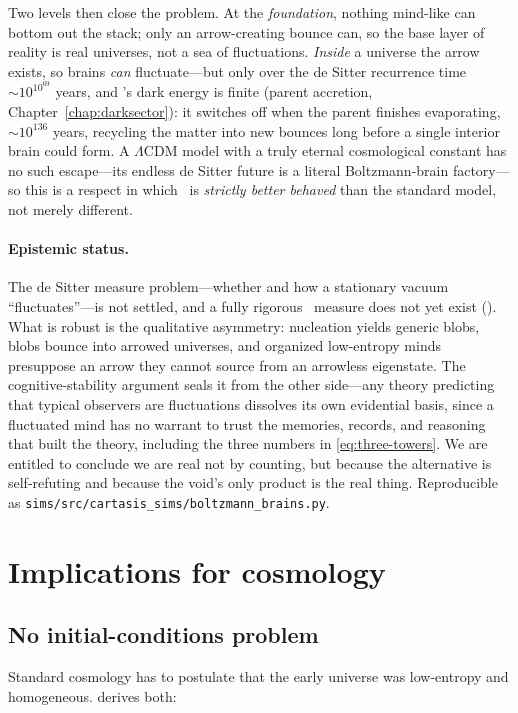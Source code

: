 Two levels then close the problem. At the \emph{foundation}, nothing mind-like
can bottom out the stack; only an arrow-creating bounce can, so the base layer of
reality is real universes, not a sea of fluctuations. \emph{Inside} a universe
the arrow exists, so brains \emph{can} fluctuate---but only over the de Sitter
recurrence time $\sim 10^{10^{69}}$ years, and \SCT's dark energy is finite
(parent accretion, Chapter~\ref{chap:darksector}): it switches off when the
parent finishes evaporating, $\sim 10^{136}$ years, recycling the matter into new
bounces long before a single interior brain could form. A $\Lambda$CDM model with
a truly eternal cosmological constant has no such escape---its endless de Sitter
future is a literal Boltzmann-brain factory---so this is a respect in which \SCT\
is \emph{strictly better behaved} than the standard model, not merely different.

\paragraph{Epistemic status.} The de Sitter measure problem---whether and how a
stationary vacuum ``fluctuates''---is not settled, and a fully rigorous \SCT\
measure does not yet exist (). What is robust is the qualitative
asymmetry: nucleation yields generic blobs, blobs bounce into arrowed universes,
and organized low-entropy minds presuppose an arrow they cannot source from an
arrowless eigenstate. The cognitive-stability argument seals it from the other
side---any theory predicting that typical observers are fluctuations dissolves
its own evidential basis, since a fluctuated mind has no warrant to trust the
memories, records, and reasoning that built the theory, including the three
numbers in \eqref{eq:three-towers}. We are entitled to conclude we are real not
by counting, but because the alternative is self-refuting and because the void's
only product is the real thing. Reproducible as
\texttt{sims/src/cartasis\_sims/boltzmann\_brains.py}.

\section{Implications for cosmology}

\subsection{No initial-conditions problem}

Standard cosmology has to postulate that the early universe was low-entropy and
homogeneous. \SCT derives both:

